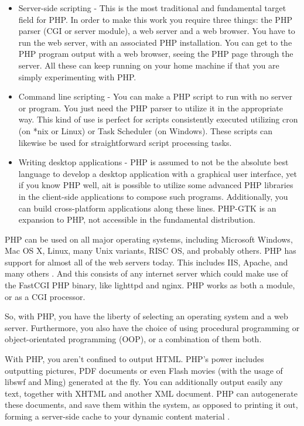 \documentclass[../thesis.tex]{subfiles}
\begin{document}
\begin{itemize}
\item Server-side scripting -  This is the most traditional and fundamental target field for PHP. In order to make this work you require three things: the PHP parser (CGI or server module), a web server and a web browser. You have to run the web server, with an associated PHP installation. You can get to the PHP program output with a web browser, seeing the PHP page through the server. All these can keep running on your home machine if that you are simply experimenting with PHP.
  
\item Command line scripting - You can make a PHP script to run with no server or program. You just need the PHP parser to utilize it in the appropriate way. This kind of use is perfect for scripts consistently executed utilizing cron (on *nix or Linux) or Task Scheduler (on Windows). These scripts can likewise be used for straightforward script processing tasks.
   
\item Writing desktop applications - PHP is assumed to not be the absolute best language to develop a desktop application with a graphical user interface, yet if you know PHP well, ait is possible to utilize some advanced PHP libraries in the client-side applications to compose such programs. Additionally, you can build cross-platform applications along these lines. PHP-GTK is an expansion to PHP, not accessible in the fundamental distribution.
\end{itemize}
    
PHP can be used on all major operating systems, including Microsoft Windows, Mac OS X, Linux, many Unix variants, RISC OS, and probably others. PHP has support for almost all of the web servers today. This includes IIS, Apache, and many others \cite{php}. And this consists of any internet server which could make use of the FastCGI PHP binary, like lighttpd and nginx. PHP works as both a module, or as a CGI processor.
\newline
    
So, with PHP, you have the liberty of selecting an operating system and a web server. Furthermore, you also have the choice of using procedural programming or object-orientated programming (OOP), or a combination of them both.
\newline
    
With PHP, you aren't confined to output HTML. PHP's power includes outputting pictures, PDF documents or even Flash movies (with the usage of libswf and Ming) generated at the fly. You can additionally output easily any text, together with XHTML and another XML document. PHP can autogenerate these documents, and save them within the system, as opposed to printing it out, forming a server-side cache to your dynamic content material \cite{php}.
\newline
    
\end{document}
